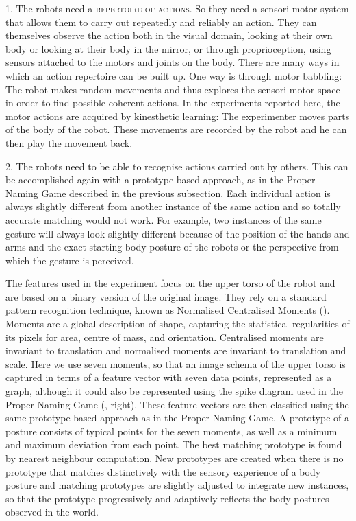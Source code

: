1. The robots need a {\scshape repertoire of actions}. So they need a sensori-motor system that allows them to carry out 
repeatedly and reliably an action. They can themselves observe the action both in the visual domain,  
looking at their own body or looking at their body in the mirror, or through proprioception, using sensors attached 
to the motors and joints on the body. There are many ways in which an action repertoire can be built up. One way 
is through motor babbling: The robot makes random movements and thus explores the sensori-motor 
space in order to find possible coherent actions. In the experiments reported here, the motor actions are acquired 
by kinesthetic learning: The experimenter moves parts of the body of the robot. These movements are recorded by the robot
and he can then play the movement back. 

2. The robots need to be able to recognise actions carried out by others. This can be accomplished again 
with a prototype-based approach, as in the Proper Naming Game described in the previous subsection. Each individual action 
is always slightly different from another instance of the same action and so totally accurate matching would not work. 
For example, two instances of the same  gesture will always look slightly different because of the 
position of the hands and arms and the exact starting body posture of the robots or the perspective from which 
the gesture is perceived. 

The features used in the experiment focus on the upper torso of the robot and are based on a binary 
version of the original image. They rely on a standard pattern recognition technique, known as Normalised 
Centralised Moments (\cite{Hu:1962}). 
Moments are a global description of shape, capturing the statistical regularities
of its pixels for area, centre of mass, and orientation. Centralised moments are invariant to translation and 
normalised moments are invariant to translation and scale. Here we use seven moments, so that an image schema of 
the upper torso is captured in terms of a feature vector with seven data points, represented as a graph, 
although it could also be represented using the spike diagram used in the Proper Naming Game (, right). 
These feature vectors are then classified using the same prototype-based approach as in the Proper Naming Game. A prototype of a posture 
consists of typical points for the seven moments, as well as a minimum and maximum deviation from 
each point. The best matching prototype is found by nearest neighbour computation. New prototypes are created 
when there is no prototype that matches distinctively with the sensory experience of a body posture and matching prototypes are
slightly adjusted to integrate new instances, so that the prototype progressively and adaptively reflects the body postures observed
in the world. 

